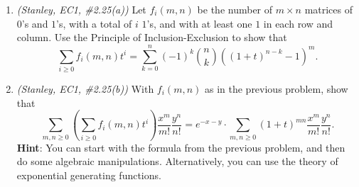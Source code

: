 \documentclass[11pt]{article}
\begin{document}
\begin{enumerate}
\item \emph{(Stanley, EC1, \#2.25(a))} Let $f_i(m,n)$ be the number of $m\times n$ matrices of $0$'s and $1$'s, with a total of $i$ $1$'s, and with at least one $1$ in each row and column. Use the Principle of Inclusion-Exclusion to show that
\[ \sum_{i \geq 0} f_i(m,n) t^i = \sum_{k=0}^{n}(-1)^k\binom{n}{k}( (1+t)^{n-k}-1)^m.\]

\item \emph{(Stanley, EC1, \#2.25(b))} With $f_i(m,n)$ as in the previous problem, show that
\[ \sum_{m,n \geq 0} \left(\sum_{i \geq 0} f_i(m,n) t^i \right) \frac{x^m}{m!} \frac{y^n}{n!} = e^{-x-y} \cdot \sum_{m,n \geq 0}  (1+t)^{mn} \frac{x^m}{m!} \frac{y^n}{n!} .\]
{\bf Hint}: You can start with the formula from the previous problem, and then do some algebraic manipulations. Alternatively, you can use the theory of exponential generating functions.

\renewcommand{\binom}{\genfrac{(}{)}{0pt}{}}
\DeclareRobustCommand{\qbinom}{\genfrac{\lbrack}{\rbrack}{0pt}{}}
\end{enumerate}
\end{document}

